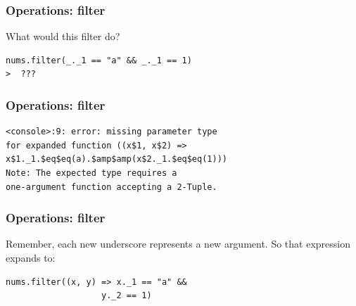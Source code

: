 \documentclass{beamer}
\begin{document}
\begin{frame}[fragile]
  \frametitle{Operations: filter}
  
\Large What would this filter do?

\vfill

\begin{lstlisting}[basicstyle=\ttfamily\Large,linebackgroundcolor={\btLstHL<1>{1}}]
nums.filter(_._1 == "a" && _._1 == 1) 
>  ???
\end{lstlisting}

\end{frame}

\begin{frame}[fragile]
  \frametitle{Operations: filter}
  

\begin{lstlisting}[basicstyle=\ttfamily\normalsize,language={}]
<console>:9: error: missing parameter type
for expanded function ((x$1, x$2) =>
x$1._1.$eq$eq(a).$amp$amp(x$2._1.$eq$eq(1)))
Note: The expected type requires a
one-argument function accepting a 2-Tuple.
\end{lstlisting}
\end{frame}

{
  \pagecolor{black}

\begin{frame}[plain]
\end{frame}
}

\begin{frame}[fragile]
  \frametitle{Operations: filter}
  
Remember, each new underscore represents a new argument. So that expression expands to:

\begin{lstlisting}[language=TeX,basicstyle=\ttfamily\Large]
nums.filter((x, y) => x._1 == "a" &&
                   y._2 == 1) 
\end{lstlisting}
\end{frame}
\end{document}
